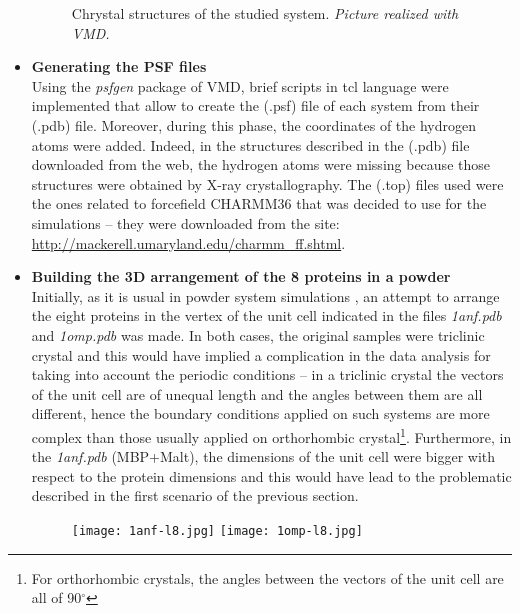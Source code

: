 \begin{itemize}
\begin{figure}[h]
\vspace{-0.25cm}
    \footnotesize{\caption{Chrystal structures of the studied system. \textit{Picture realized with VMD.}}
    \label{fig:pdb-structures}
    }
\end{figure}

\item \textbf{Generating the PSF files}\\
Using the \textit{psfgen} package of VMD, brief scripts in tcl language were implemented that allow to create the (.psf) file of each system from their (.pdb) file. Moreover, during this phase, the coordinates of the hydrogen atoms were added. Indeed, in the structures described in the (.pdb) file downloaded from the web, the hydrogen atoms were missing because those structures were obtained by X-ray crystallography. The (.top) files used were the ones related to forcefield CHARMM36 that was decided to use for the simulations -- they were downloaded from the site: \url{http://mackerell.umaryland.edu/charmm_ff.shtml}. 

\item \textbf{Building the 3D arrangement of the 8 proteins in a powder}\\
Initially, as it is usual in powder system simulations \cite{rahaman2017configurational, fichou2015molecular}, an attempt to arrange the eight proteins in the vertex of the unit cell indicated in the files \textit{1anf.pdb} and \textit{1omp.pdb} was made. In both cases, the original samples were triclinic crystal and this would have implied a complication in the data analysis for taking into account the periodic conditions -- in a triclinic crystal the vectors of the unit cell are of unequal length and the angles between them are all different, hence the boundary conditions applied on such systems are more complex than those usually applied on orthorhombic crystal\footnote{For orthorhombic crystals, the angles between the vectors of the unit cell are all of 90$^\circ$}. Furthermore, in the \textit{1anf.pdb} (MBP+Malt), the dimensions of the unit cell were bigger with respect to the protein dimensions and this would have lead to the problematic described in the first scenario of the previous section.
\begin{figure}[h]
\begin{center}
\begin{minipage}[t]{0.9\textwidth}
\centering
\hfill
\texttt{[image: 1anf-l8.jpg]}
\hspace{0.65cm}
\texttt{[image: 1omp-l8.jpg]}
\hfill
\end{minipage} 


\end{center}
\end{figure}
\end{itemize}
